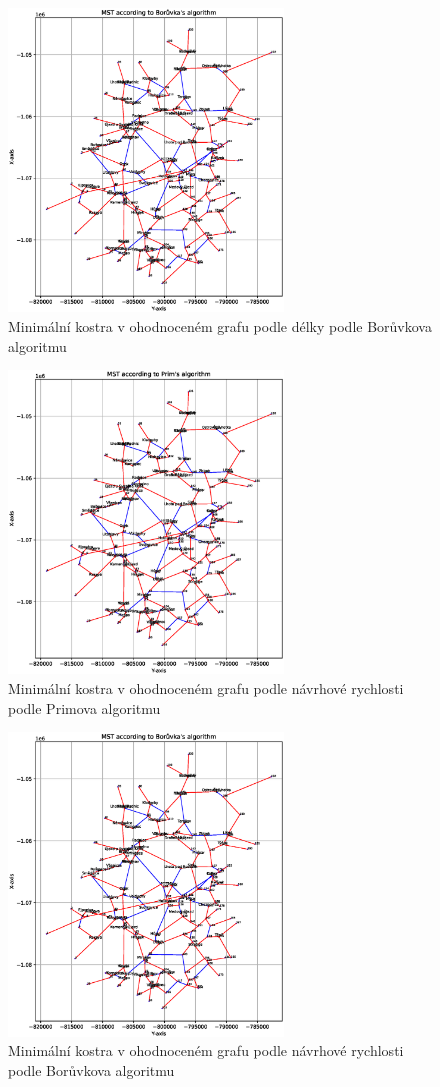 \begin{figure}[H]
    \centering
    \includegraphics[width=0.65\textwidth]{images/Figure_3_curvature.eps}
    \caption{Minimální kostra v ohodnoceném grafu podle délky podle Borůvkova algoritmu}
\end{figure}
\begin{figure}[H]
    \centering
    \includegraphics[width=0.65\textwidth]{images/Figure_2_curvature.eps}
    \caption{Minimální kostra v ohodnoceném grafu podle návrhové rychlosti podle Primova algoritmu}
\end{figure}

\begin{figure}[H]
    \centering
    \includegraphics[width=0.65\textwidth]{images/Figure_3_curvature.eps}
    \caption{Minimální kostra v ohodnoceném grafu podle návrhové rychlosti podle Borůvkova algoritmu}
\end{figure}